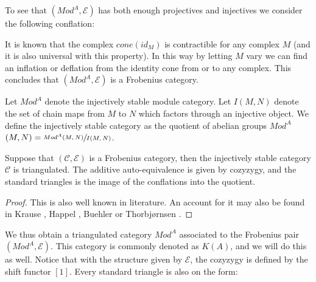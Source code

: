 \documentclass[../thesis.tex]{subfiles}
\begin{document}
            To see that $(Mod^A, \mathcal{E})$ has both enough projectives and injectives we consider the following conflation:

            \begin{center}
            \end{center}

            It is known that the complex $cone(id_M)$ is contractible for any complex $M$ (and it is also universal with this property). In this way by letting $M$ vary we can find an inflation or deflation from the identity cone from or to any complex. This concludes that $(Mod^A, \mathcal{E})$ is a Frobenius category.
            
            Let \underline{$Mod^A$} denote the injectively stable module category. Let $I(M,N)$ denote the set of chain maps from $M$ to $N$ which factors through an injective object. We define the injectively stable category as the quotient of abelian groups \underline{$Mod^A$}$(M,N)=\sfrac{Mod^A(M,N)}{I(M,N)}$.

            \begin{thm}
                Suppose that $(\mathcal{C},\mathcal{E})$ is a Frobenius category, then the injectively stable category \underline{$\mathcal{C}$} is triangulated. The additive auto-equivalence is given by cozyzygy, and the standard triangles is the image of the conflations into the quotient.
            \end{thm}

            \begin{proof}
                This is also well known in literature. An account for it may also be found in Krause \cite{Krause21}, Happel \cite{Happel88}, Buehler \cite{Buhler10} or Thorbjørnsen \cite{Thorbjornsen21}.
            \end{proof}

            We thus obtain a triangulated category \underline{$Mod^A$} associated to the Frobenius pair $(Mod^A, \mathcal{E})$. This category is commonly denoted as $K(A)$, and we will do this as well. Notice that with the structure given by $\mathcal{E}$, the cozyzygy is defined by the shift functor $[1]$. Every standard triangle is also on the form:

            \begin{center}
            \end{center}
\end{document}
